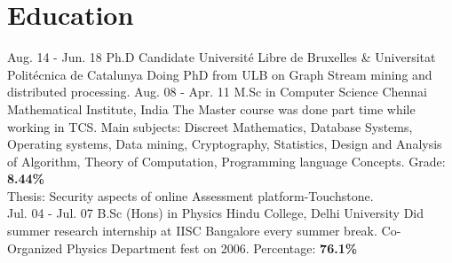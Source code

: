 \documentclass[]{cv-class}
\begin{document}
\section{Education}
\begin{entrylist}
  \entry
    {Aug. 14 - Jun. 18}
    {Ph.D Candidate}
    {Universit\'{e} Libre de Bruxelles \&  Universitat Polit\'{e}cnica de Catalunya}
	{Doing PhD from ULB on Graph Stream mining and distributed processing.}
  \entry
    {Aug. 08 - Apr. 11}
    {M.Sc in Computer Science}
    {Chennai Mathematical Institute, India}
    {The Master course was done part time while working in TCS.
    Main subjects: Discreet Mathematics, Database Systems, Operating systems, Data mining, Cryptography, Statistics, Design and Analysis of Algorithm,
    Theory of Computation, Programming language Concepts. Grade: \textbf{8.44\%}\\
    Thesis: Security aspects of online Assessment platform-Touchstone.\\}
      \entry
    {Jul. 04 - Jul. 07}
    {B.Sc (Hons) in Physics}
    {Hindu College, Delhi University}
    {Did summer research internship at IISC Bangalore every summer break. Co-Organized Physics Department fest on 2006.
     Percentage: \textbf{76.1\%}\\}
\end{entrylist}
\end{document}
